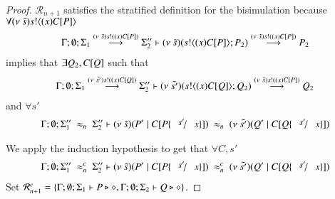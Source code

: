 \begin{proof}
	\noi $\mathcal{R}_{n+1}$ satisfies the stratified definition for the bisimulation 
	because $\forall (\nu\ \tilde{s}) s ! \langle (x) C[P] \rangle $
%
	\begin{eqnarray*}
		\Gamma; \emptyset; \Sigma_1 \stackrel{(\nu\ \tilde{s}) s! ((x) C[P])}{\longrightarrow} \Sigma_2'' \vdash (\nu\ \tilde{s})(s ! \langle (x)C[P] \rangle ; P_2) \stackrel{(\nu\ \tilde{s}) s! ((x) C[P])}{\longrightarrow} P_2
	\end{eqnarray*}
%
	implies that $\exists Q_2, C[Q]$ such that
%
	\begin{eqnarray*}
		\Gamma; \emptyset; \Sigma_1 \stackrel{(\nu\ \tilde{s'}) s! ((x) C[Q])}{\longrightarrow} \Sigma_2'' \vdash (\nu\ \tilde{s'})(s ! \langle (x)C[Q] \rangle ; Q_2) \stackrel{(\nu\ \tilde{s}) s! ((x) C[P])}{\longrightarrow} Q_2
	\end{eqnarray*}
%
	\noi and $\forall s'$
	\begin{eqnarray*}
		\Gamma; \emptyset; \Sigma_1'' \ \wb_{n}\ \Sigma_2'' \proves \newsp{\tilde{s}}{P' \Par \context{C}{P \subst{s'}{x}}}\ \wb_{n}\ 
		\newsp{\tilde{s'}}{Q' \Par \context{C}{Q \subst{s'}{x}}}
	\end{eqnarray*}

%
	\noi We apply the induction hypothesis to get that
	$\forall C, s'$
	\begin{eqnarray}
		\Gamma; \emptyset; \Sigma_1'' \ \wbc_{n}\ \Sigma_2'' \proves \newsp{\tilde{s}}{P' \Par \context{C}{P \subst{s'}{x}}}\ \wbc_{n}\ 
		\newsp{\tilde{s'}}{Q' \Par \context{C}{Q \subst{s'}{x}}} \label{lem:wb_is_wbc3}
	\end{eqnarray}
%
	\noi Set $\mathcal{R}^c_{n+1} = \{\Gamma; \emptyset; \Sigma_1 \vdash P \triangleright \diamond, \Gamma; \emptyset; \Sigma_2 \vdash Q \triangleright \diamond\}$.


\end{proof}
